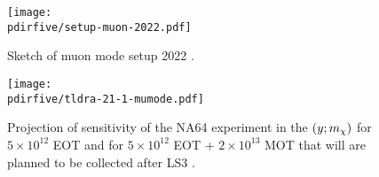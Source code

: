 \begin{figure}[bth!]
  \centering
  \texttt{[image: \\pdirfive/setup-muon-2022.pdf]}
  \caption[Sketch of muon mode setup 2022 for phase 1]{Sketch of muon mode setup 2022 \cite{Gninenko:2640930}.}
  \label{fig:muon-mode-setup-phase2}
\end{figure}

\begin{figure}[bth!]
  \centering
  \texttt{[image: \\pdirfive/tldra-21-1-mumode.pdf]}
  \caption[sensitivity projection for invisible mode + muon mode 2021]{Projection of sensitivity of the NA64 experiment in the $(y;m_{\chi})$ for $5 \times 10^{12}$ EOT and for $5 \times 10^{12}$ EOT + $2 \times 10^{13}$ MOT that will are planned to be collected after LS3 \cite{Gninenko:2019qiv}.}
  \label{fig:dmyplane-mumode}
\end{figure}

